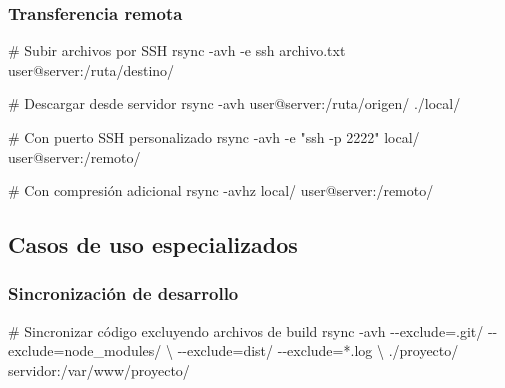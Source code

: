\documentclass[
  11pt,
  letterpaper,
  oneside,
  openany]{scrbook}
\newenvironment{Shaded}{}{}
\newcommand{\AttributeTok}[1]{\textcolor[rgb]{0.84,0.23,0.29}{#1}}
\newcommand{\CommentTok}[1]{\textcolor[rgb]{0.42,0.45,0.49}{#1}}
\newcommand{\DataTypeTok}[1]{\textcolor[rgb]{0.84,0.23,0.29}{#1}}
\newcommand{\FunctionTok}[1]{\textcolor[rgb]{0.44,0.26,0.76}{#1}}
\newcommand{\NormalTok}[1]{\textcolor[rgb]{0.14,0.16,0.18}{#1}}
\newcommand{\OperatorTok}[1]{\textcolor[rgb]{0.14,0.16,0.18}{#1}}
\newcommand{\StringTok}[1]{\textcolor[rgb]{0.01,0.18,0.38}{#1}}
\begin{document}
\subsubsection{Transferencia remota}\label{transferencia-remota}

\begin{Shaded}
\begin{Highlighting}[]
\CommentTok{\# Subir archivos por SSH}
\FunctionTok{rsync} \AttributeTok{{-}avh} \AttributeTok{{-}e}\NormalTok{ ssh archivo.txt user@server:/ruta/destino/}

\CommentTok{\# Descargar desde servidor}
\FunctionTok{rsync} \AttributeTok{{-}avh}\NormalTok{ user@server:/ruta/origen/ ./local/}

\CommentTok{\# Con puerto SSH personalizado}
\FunctionTok{rsync} \AttributeTok{{-}avh} \AttributeTok{{-}e} \StringTok{"ssh {-}p 2222"}\NormalTok{ local/ user@server:/remoto/}

\CommentTok{\# Con compresión adicional}
\FunctionTok{rsync} \AttributeTok{{-}avhz}\NormalTok{ local/ user@server:/remoto/}
\end{Highlighting}
\end{Shaded}

\subsection{Casos de uso
especializados}\label{casos-de-uso-especializados}

\subsubsection{Sincronización de
desarrollo}\label{sincronizaciuxf3n-de-desarrollo}

\begin{Shaded}
\begin{Highlighting}[]
\CommentTok{\# Sincronizar código excluyendo archivos de build}
\FunctionTok{rsync} \AttributeTok{{-}avh} \AttributeTok{{-}{-}exclude}\OperatorTok{=}\StringTok{\textquotesingle{}.git/\textquotesingle{}} \AttributeTok{{-}{-}exclude}\OperatorTok{=}\StringTok{\textquotesingle{}node\_modules/\textquotesingle{}} \DataTypeTok{\textbackslash{}}
           \AttributeTok{{-}{-}exclude}\OperatorTok{=}\StringTok{\textquotesingle{}dist/\textquotesingle{}} \AttributeTok{{-}{-}exclude}\OperatorTok{=}\StringTok{\textquotesingle{}*.log\textquotesingle{}} \DataTypeTok{\textbackslash{}}
\NormalTok{           ./proyecto/ servidor:/var/www/proyecto/}
\end{Highlighting}
\end{Shaded}
\end{document}
